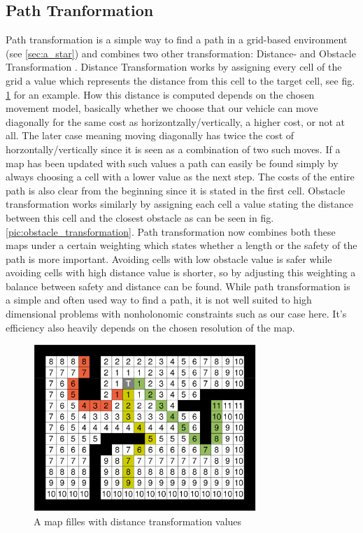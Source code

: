 \subsection{Path Tranformation}
\label{sec:pathtransformation}

Path transformation is a simple way to find a path in a grid-based environment (see \ref{sec:a_star}) and combines two other transformation: Distance- and Obstacle Transformation \cite{35}. Distance Transformation works by assigning every cell of the grid a value which represents the distance from this cell to the target cell, see fig. \ref{pic:distance_transformation} for an example. How this distance is computed depends on the chosen movement model, basically whether we choose that our vehicle can move diagonally for the same cost as horizontzally/vertically, a higher cost, or not at all. The later case meaning moving diagonally has twice the cost of horzontally/vertically since it is seen as a combination of two such moves. If a map has been updated with such values a path can easily be found simply by always choosing a cell with a lower value as the next step. The costs of the entire path is also clear from the beginning since it is stated in the first cell. Obstacle transformation works similarly by assigning each cell a value stating the distance between this cell and the closest obstacle as can be seen in fig. \ref{pic:obstacle_transformation}. Path transformation now combines both these maps under a certain weighting which states whether a length or the safety of the path is more important. Avoiding cells with low obstacle value is safer while avoiding cells with high distance value is shorter, so by adjusting this weighting a balance between safety and distance can be found. 
While path transformation is a simple and often used way to find a path, it is not well suited to high dimensional problems with nonholonomic constraints such as our case here. It's efficiency also heavily depends on the chosen resolution of the map.

\begin{figure}[b]
\centering
\includegraphics[width=0.75\textwidth]{./Chapters/Figures/distance_transformation.png}
\caption{A map filles with distance transformation values\label{pic:distance_transformation}}
\end{figure}

